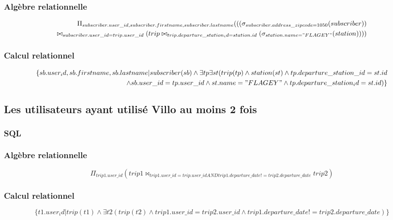 \documentclass[a4paper,10pt]{article}
\begin{document}
\subsubsection{Algèbre relationnelle}
\begin{align}
\Pi_{subscriber.user\_id, subscriber.firstname, subscriber.lastname}(((\sigma_{subscriber.address\_zipcode=1050}(subscriber)) \\\bowtie_{subscriber.user\_id = trip.user\_id} (trip \bowtie_{trip.departure\_station_id = station.id} (\sigma_{station.name="FLAGEY"}(station))))
\end{align}
\subsubsection{Calcul relationnel}
\begin{align}
	\{ sb.user_id, sb.firstname, sb.lastname | subscriber(sb) \wedge \exists tp  \exists st ( trip(tp) \wedge station(st) \wedge tp.departure\_station\_id = st.id \\ \wedge sb.user\_id = tp.user\_id \wedge st.name = "FLAGEY" \wedge tp.departure\_station_id = st.id ) \}
\end{align}

\subsection{Les utilisateurs ayant utilisé Villo au moins 2 fois}
\subsubsection{SQL}


\subsubsection{Algèbre relationnelle}
\begin{displaymath}
\Pi_{trip1.user\_id}( trip1 \bowtie_{trip1.user\_id = trip.user\_id AND trip1.departure\_date != trip2.departure\_date} trip2)
\end{displaymath}
\subsubsection{Calcul relationnel}
\begin{displaymath}
	\{ t1.user_id | trip(t1) \wedge \exists t2 (trip(t2) \wedge trip1.user\_id = trip2.user\_id
\wedge trip1.departure\_date != trip2.departure\_date )\}
\end{displaymath}
\end{document}
